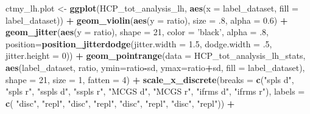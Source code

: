 \documentclass[
]{article}
\newenvironment{Shaded}{\begin{snugshade}}{\end{snugshade}}
\newcommand{\DataTypeTok}[1]{\textcolor[rgb]{0.13,0.29,0.53}{#1}}
\newcommand{\DecValTok}[1]{\textcolor[rgb]{0.00,0.00,0.81}{#1}}
\newcommand{\FloatTok}[1]{\textcolor[rgb]{0.00,0.00,0.81}{#1}}
\newcommand{\KeywordTok}[1]{\textcolor[rgb]{0.13,0.29,0.53}{\textbf{#1}}}
\newcommand{\NormalTok}[1]{#1}
\newcommand{\OperatorTok}[1]{\textcolor[rgb]{0.81,0.36,0.00}{\textbf{#1}}}
\newcommand{\StringTok}[1]{\textcolor[rgb]{0.31,0.60,0.02}{#1}}
\begin{document}
\begin{Shaded}
\begin{Highlighting}[]
\NormalTok{ctmy_lh.plot <-}\StringTok{ }\KeywordTok{ggplot}\NormalTok{(HCP_tot_analysis_lh, }\KeywordTok{aes}\NormalTok{(}\DataTypeTok{x =}\NormalTok{ label_dataset, }\DataTypeTok{fill =}\NormalTok{ label_dataset)) }\OperatorTok{+}\StringTok{ }
\StringTok{  }\KeywordTok{geom_violin}\NormalTok{(}\KeywordTok{aes}\NormalTok{(}\DataTypeTok{y =}\NormalTok{ ratio), }\DataTypeTok{size =} \FloatTok{.8}\NormalTok{, }\DataTypeTok{alpha =} \FloatTok{0.6}\NormalTok{) }\OperatorTok{+}\StringTok{ }
\StringTok{  }\KeywordTok{geom_jitter}\NormalTok{(}\KeywordTok{aes}\NormalTok{(}\DataTypeTok{y =}\NormalTok{ ratio), }
              \DataTypeTok{shape =} \DecValTok{21}\NormalTok{, }\DataTypeTok{color =} \StringTok{'black'}\NormalTok{, }\DataTypeTok{alpha =} \FloatTok{.8}\NormalTok{,}
              \DataTypeTok{position=}\KeywordTok{position_jitterdodge}\NormalTok{(}\DataTypeTok{jitter.width =} \FloatTok{1.5}\NormalTok{, }
                                            \DataTypeTok{dodge.width =} \FloatTok{.5}\NormalTok{, }\DataTypeTok{jitter.height =} \DecValTok{0}\NormalTok{)) }\OperatorTok{+}\StringTok{ }
\StringTok{  }\KeywordTok{geom_pointrange}\NormalTok{(}\DataTypeTok{data =}\NormalTok{ HCP_tot_analysis_lh_stats, }
                  \KeywordTok{aes}\NormalTok{(label_dataset, ratio, }\DataTypeTok{ymin=}\NormalTok{ratio}\OperatorTok{-}\NormalTok{sd, }\DataTypeTok{ymax=}\NormalTok{ratio}\OperatorTok{+}\NormalTok{sd, }
                      \DataTypeTok{fill =}\NormalTok{ label_dataset), }
                  \DataTypeTok{shape =} \DecValTok{21}\NormalTok{, }\DataTypeTok{size =} \DecValTok{1}\NormalTok{, }\DataTypeTok{fatten =} \DecValTok{4}\NormalTok{) }\OperatorTok{+}
\StringTok{  }\KeywordTok{scale_x_discrete}\NormalTok{(}\DataTypeTok{breaks =} \KeywordTok{c}\NormalTok{(}\StringTok{"spls d"}\NormalTok{, }\StringTok{"spls r"}\NormalTok{, }
                              \StringTok{"sspls d"}\NormalTok{, }\StringTok{"sspls r"}\NormalTok{, }
                              \StringTok{"MCGS d"}\NormalTok{, }\StringTok{"MCGS r"}\NormalTok{, }
                              \StringTok{"ifrms d"}\NormalTok{, }\StringTok{"ifrms r"}\NormalTok{), }
                   \DataTypeTok{labels =} \KeywordTok{c}\NormalTok{(}
                              \StringTok{"disc"}\NormalTok{, }\StringTok{"repl"}\NormalTok{,}
                              \StringTok{"disc"}\NormalTok{, }\StringTok{"repl"}\NormalTok{, }
                              \StringTok{"disc"}\NormalTok{, }\StringTok{"repl"}\NormalTok{,}
                              \StringTok{"disc"}\NormalTok{, }\StringTok{"repl"}\NormalTok{)) }\OperatorTok{+}

\end{Highlighting}
\end{Shaded}
\end{document}
